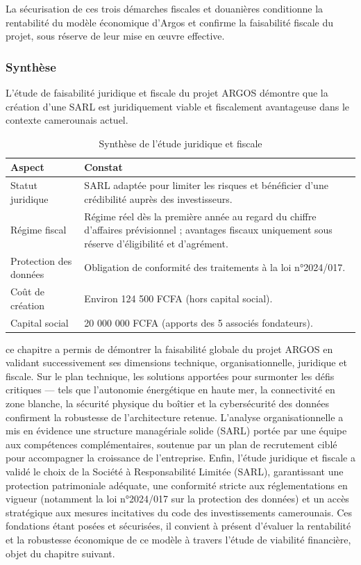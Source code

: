 La sécurisation de ces trois démarches fiscales et douanières conditionne la rentabilité du modèle économique d'Argos et confirme la faisabilité fiscale du projet, sous réserve de leur mise en œuvre effective.


\subsubsection{Synthèse}

L'étude de faisabilité juridique et fiscale du projet ARGOS démontre que la création d'une SARL est juridiquement viable et fiscalement avantageuse dans le contexte camerounais actuel.

\begin{table}[htbp]
    \centering
    \caption{Synthèse de l'étude juridique et fiscale}
    \label{tab:synthese_etude}
    \renewcommand{\arraystretch}{1.5}
    \begin{tabularx}{\textwidth}{|>{\raggedright\arraybackslash}p{4cm}|X|}
        \hline
        \textbf{Aspect} & \textbf{Constat} \\
        \hline
        Statut juridique & SARL adaptée pour limiter les risques et bénéficier d'une crédibilité auprès des investisseurs. \\
        \hline
        Régime fiscal & Régime réel dès la première année au regard du chiffre d'affaires prévisionnel ; avantages fiscaux uniquement sous réserve d'éligibilité et d'agrément. \\
        \hline
        Protection des données & Obligation de conformité des traitements à la loi n°2024/017. \\
        \hline
        Coût de création & Environ 124 500 FCFA (hors capital social). \\
        \hline
        Capital social & 20 000 000 FCFA (apports des 5 associés fondateurs). \\
        \hline
    \end{tabularx}
    \tablesourcepromoteurs
\end{table}

 ce chapitre a permis de démontrer la faisabilité globale du projet ARGOS en validant successivement ses dimensions technique, organisationnelle, juridique et fiscale. Sur le plan technique, les solutions apportées pour surmonter les défis critiques — tels que l'autonomie énergétique en haute mer, la connectivité en zone blanche, la sécurité physique du boîtier et la cybersécurité des données confirment la robustesse de l'architecture retenue. L'analyse organisationnelle a mis en évidence une structure managériale solide (SARL) portée par une équipe aux compétences complémentaires, soutenue par un plan de recrutement ciblé pour accompagner la croissance de l'entreprise. Enfin, l'étude juridique et fiscale a validé le choix de la Société à Responsabilité Limitée (SARL), garantissant une protection patrimoniale adéquate, une conformité stricte aux réglementations en vigueur (notamment la loi n°2024/017 sur la protection des données) et un accès stratégique aux mesures incitatives du code des investissements camerounais. Ces fondations étant posées et sécurisées, il convient à présent d'évaluer la rentabilité et la robustesse économique de ce modèle à travers l'étude de viabilité financière, objet du chapitre suivant.
